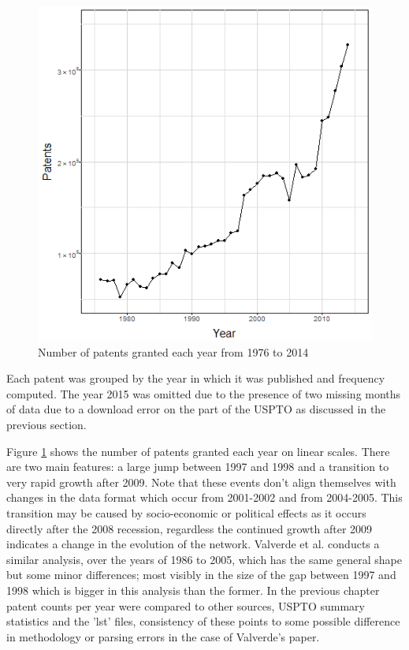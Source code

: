 \begin{figure}
\centering
 \centering
 \includegraphics[width=0.7\linewidth]{Figures/PatentCountVsYear}
\caption[Number of patents granted each year]{Number of patents granted each year from 1976 to 2014}
\label{fig:PatentCountVsYear}
\end{figure}

Each patent was grouped by the year in which it was published and frequency computed. The year 2015 was omitted due to the presence of two missing months of data due to a download error on the part of the USPTO as discussed in the previous section. 

Figure \ref{fig:PatentCountVsYear} shows the number of patents granted each year on linear scales. There are two main features: a large jump between 1997 and 1998 and a transition to very rapid growth after 2009. Note that these events don't align themselves with changes in the data format which occur from 2001-2002 and from 2004-2005. This transition may be caused by socio-economic or political effects as it occurs directly after the 2008 recession, regardless the continued growth after 2009 indicates a change in the evolution of the network. Valverde et al. \cite{valverde2007topology} conducts a similar analysis, over the years of 1986 to 2005, which has the same general shape but some minor differences; most visibly in the size of the gap between 1997 and 1998 which is bigger in this analysis than the former. In the previous chapter patent counts per year were compared to other sources, USPTO summary statistics and the 'lst' files, consistency of these points to some possible difference in methodology or parsing errors in the case of Valverde's paper. 

